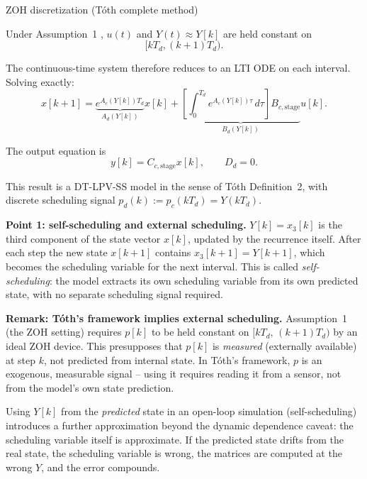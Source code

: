 \documentclass[11pt]{article}
\newcounter{derivstep}
\newenvironment{derivationstep}[1]
{
    \refstepcounter{derivstep}
    \begin{stepbox}{#1}
}
{
    \end{stepbox}
}
\begin{document}
\begin{derivationstep}{ZOH discretization (Tóth complete method)}

Under Assumption~1 \cite{toth2010}, \(u(t)\) and \(Y(t)\approx Y[k]\) are held constant on
\[
[kT_d,(k+1)T_d).
\]

The continuous-time system therefore reduces to an LTI ODE on each interval. Solving exactly:
\[
x[k+1]
=
\underbrace{e^{A_c(Y[k])T_d}}_{A_d(Y[k])}x[k]
+
\underbrace{\left[\int_0^{T_d} e^{A_c(Y[k])\tau}\, d\tau\right] B_{c,\text{stage}}}_{B_d(Y[k])}u[k].
\]

The output equation is
\[
y[k] = C_{c,\text{stage}}x[k],
\qquad
D_d = 0.
\]

This result is a DT-LPV-SS model in the sense of Tóth \cite{toth2010} Definition~2, with
discrete scheduling signal $p_d(k) := p_c(kT_d) = Y(kT_d)$.

\medskip
\textbf{Point 1: self-scheduling and external scheduling.}
$Y[k] = x_3[k]$ is the third component of the state vector $x[k]$, updated by the
recurrence itself. After each step the new state $x[k+1]$ contains $x_3[k+1] = Y[k+1]$,
which becomes the scheduling variable for the next interval. This is called
\emph{self-scheduling}: the model extracts its own scheduling variable from its own predicted
state, with no separate scheduling signal required.

\medskip
\textbf{Remark: Tóth's framework implies external scheduling.}
Assumption~1 (the ZOH setting) requires $p[k]$ to be held constant on
$[kT_d,\,(k+1)T_d)$ by an ideal ZOH device. This presupposes that $p[k]$ is
\emph{measured} (externally available) at step $k$, not predicted from internal state.
In Tóth's framework, $p$ is an exogenous, measurable signal -- using it requires reading
it from a sensor, not from the model's own state prediction.

Using $Y[k]$ from the \emph{predicted} state in an open-loop simulation (self-scheduling)
introduces a further approximation beyond the dynamic dependence caveat: the scheduling
variable itself is approximate. If the predicted state drifts from the real state, the
scheduling variable is wrong, the matrices are computed at the wrong $Y$, and the error
compounds.


\end{derivationstep}
\end{document}
